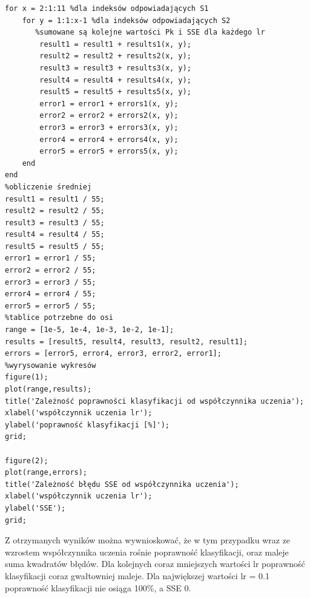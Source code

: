 \documentclass[a4paper, 12pt]{article}
\begin{document}
\begin{lstlisting}[frame=single, caption=Skrypt do analizy dotyczącej wpływu wartości współczynnika uczenia na uczenie sieci]
for x = 2:1:11 %dla indeksów odpowiadających S1
    for y = 1:1:x-1	%dla indeksów odpowiadających S2
       %sumowane są kolejne wartości Pk i SSE dla każdego lr
        result1 = result1 + results1(x, y);
        result2 = result2 + results2(x, y);
        result3 = result3 + results3(x, y);
        result4 = result4 + results4(x, y);
        result5 = result5 + results5(x, y);
        error1 = error1 + errors1(x, y);
        error2 = error2 + errors2(x, y);
        error3 = error3 + errors3(x, y);
        error4 = error4 + errors4(x, y);
        error5 = error5 + errors5(x, y);
    end
end
%obliczenie średniej
result1 = result1 / 55;
result2 = result2 / 55;
result3 = result3 / 55;
result4 = result4 / 55;
result5 = result5 / 55;
error1 = error1 / 55;
error2 = error2 / 55;
error3 = error3 / 55;
error4 = error4 / 55;
error5 = error5 / 55;
%tablice potrzebne do osi
range = [1e-5, 1e-4, 1e-3, 1e-2, 1e-1];
results = [result5, result4, result3, result2, result1];
errors = [error5, error4, error3, error2, error1];
%wyrysowanie wykresów
figure(1);
plot(range,results);
title('Zależność poprawności klasyfikacji od współczynnika uczenia');
xlabel('współczynnik uczenia lr');
ylabel('poprawność klasyfikacji [%]');
grid;

figure(2);
plot(range,errors);
title('Zależność błędu SSE od współczynnika uczenia');
xlabel('współczynnik uczenia lr');
ylabel('SSE');
grid;
\end{lstlisting}

\clearpage
Z otrzymanych wyników można wywnioskować, że w tym przypadku wraz ze wzrostem współczynnika uczenia rośnie poprawność klasyfikacji, oraz maleje suma kwadratów błędów. Dla kolejnych coraz mniejszych wartości lr poprawność klasyfikacji coraz gwałtowniej maleje. Dla największej wartości lr = 0.1 poprawność klasyfikacji nie osiąga 100\%, a SSE 0.
\end{document}
